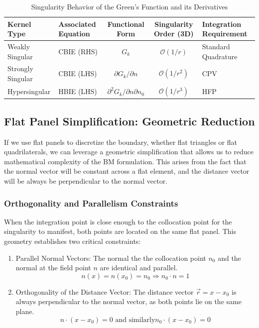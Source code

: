 \begin{table}
    \centering
    \caption{Singularity Behavior of the Green's Function and its Derivatives}
    \begin{tabularx}{\textwidth}{X X c c X}
        \toprule
        \textbf{Kernel Type} & \textbf{Associated Equation} & \textbf{Functional Form} & \textbf{Singularity Order (3D)} & \textbf{Integration Requirement} \\
        \midrule
        Weakly Singular & \ac{CBIE} (RHS) & $G_k$ & $\mathcal{O}(1/r)$ & Standard Quadrature \\
        \midrule
        Strongly Singular & \ac{CBIE} (LHS) & $\partial G_k / \partial n$ & $\mathcal{O}(1/r^2)$ & \ac{CPV} \\
        \midrule
        Hypersingular & \ac{HBIE} (LHS) & $\partial^2 G_k /\partial n \partial n_0$ & $\mathcal{O}(1/r^3)$ & \ac{HFP} \\
        \bottomrule
    \end{tabularx}
\end{table}

\subsection{Flat Panel Simplification: Geometric Reduction} \label{subsec:flat-panel-simplification}

If we use flat panels to discretize the boundary, whether flat triangles or flat quadrilaterals, we can leverage a geometric simplification that allows us to reduce mathematical complexity of the \ac{BM} formulation. 
This arises from the fact that the normal vector will be constant across a flat element, and the distance vector will be always be perpendicular to the normal vector.

\subsubsection{Orthogonality and Parallelism Constraints} \label{subsubsec:orthogonality-parallelism-constraints}
When the integration point is close enough to the collocation point for the singularity to manifest, both points are located on the same flat panel. This geometry establishes two critical constraints:
\begin{enumerate}
    \item Parallel Normal Vectors: The normal the the collocation point $n_0$ and the normal at the field point $n$ are identical and parallel.
    $$n(x) = n(x_0) = n_0 \Longrightarrow n_0 \cdot n = 1$$
    \item Orthogonality of the Distance Vector: The distance vector $\vec{r} = x - x_0$ is always perpendicular to the normal vector, as both points lie on the same plane.
    $$ n \cdot (x - x_0) = 0 \text{ and similarly} n_0 \cdot (x - x_0) = 0$$
\end{enumerate}

